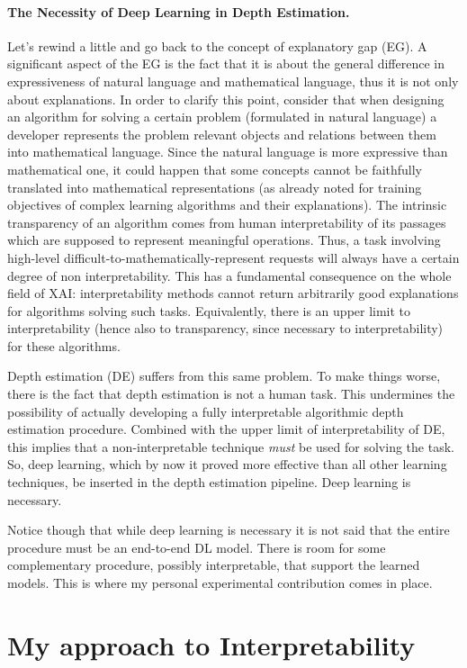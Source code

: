 \vfill

\paragraph{The Necessity of Deep Learning in Depth Estimation.}
Let's rewind a little and go back to the concept of explanatory gap (EG).
A significant aspect of the EG is the fact that it is about the general difference in expressiveness of natural language and mathematical language, thus it is not only about explanations.
In order to clarify this point, consider that when designing an algorithm for solving a certain problem (formulated in natural language) a developer represents the problem relevant objects and relations between them into mathematical language.
Since the natural language is more expressive than mathematical one, it could happen that some concepts cannot be faithfully translated into mathematical representations (as already noted for training objectives of complex learning algorithms and their explanations).
The intrinsic transparency of an algorithm comes from human interpretability of its passages which are supposed to represent meaningful operations.
Thus, a task involving high-level difficult-to-mathematically-represent requests will always have a certain degree of non interpretability.
This has a fundamental consequence on the whole field of XAI: interpretability methods cannot return arbitrarily good explanations for algorithms solving such tasks.
Equivalently, there is an upper limit to interpretability (hence also to transparency, since necessary to interpretability) for these algorithms.

Depth estimation (DE) suffers from this same problem.
To make things worse, there is the fact that depth estimation is not a human task.
This undermines the possibility of actually developing a fully interpretable algorithmic depth estimation procedure.
Combined with the upper limit of interpretability of DE, this implies that a non-interpretable technique \textit{must} be used for solving the task.
So, deep learning, which by now it proved more effective than all other learning techniques,  be inserted in the depth estimation pipeline.
Deep learning is necessary.

Notice though that while deep learning is necessary it is not said that the entire procedure must be an end-to-end DL model.
There is room for some complementary procedure, possibly interpretable, that support the learned models.
This is where my personal experimental contribution comes in place.

\section{My approach to Interpretability}
